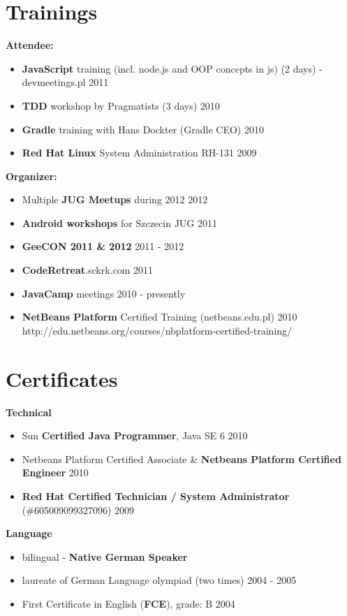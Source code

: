 \documentclass{res}
\begin{document}
\begin{resume}
\section{Trainings} 
{\bf Attendee:}
\begin{itemize}
 \item \textbf{JavaScript} training (incl. node.js and OOP concepts in js) (2 days) - devmeetings.pl \hfill 2011
 \item \textbf{TDD} workshop by Pragmatists (3 days) \hfill 2010
 \item \textbf{Gradle} training with Hans Dockter (Gradle CEO) \hfill 2010
 \item \textbf{Red Hat Linux} System Administration RH-131 \hfill 2009
\end{itemize}
{\bf Organizer:}
\begin{itemize}
 \item Multiple \textbf{JUG Meetups} during 2012 \hfill 2012 
 \item \textbf{Android workshops} for Szczecin JUG \hfill 2011
 \item \textbf{GeeCON 2011 \& 2012} \hfill 2011 - 2012
 \item \textbf{CodeRetreat}.sckrk.com \hfill 2011
 \item \textbf{JavaCamp} meetings \hfill 2010 - presently
 \item \textbf{NetBeans Platform} Certified Training (netbeans.edu.pl) \hfill 2010 \\
	http://edu.netbeans.org/courses/nbplatform-certified-training/ 
\end{itemize}

\section{Certificates} 
{\bf Technical}
\begin{itemize}
 \item Sun \textbf{Certified Java Programmer}, Java SE 6 \hfill 2010
 \item Netbeans Platform Certified Associate \& \textbf{Netbeans Platform Certified Engineer} \hfill 2010
 \item \textbf{Red Hat Certified Technician / System
Administrator} (\#605009099327096) \hfill 2009\\
\end{itemize}
{\bf Language}
\begin{itemize}
 \item bilingual - \textbf{Native German Speaker}
 \item laureate of German Language olympiad (two times) \hfill 2004 - 2005
 \item First Certificate in English (\textbf{FCE}), grade: B \hfill 2004
\end{itemize}


\end{resume}
\end{document}
